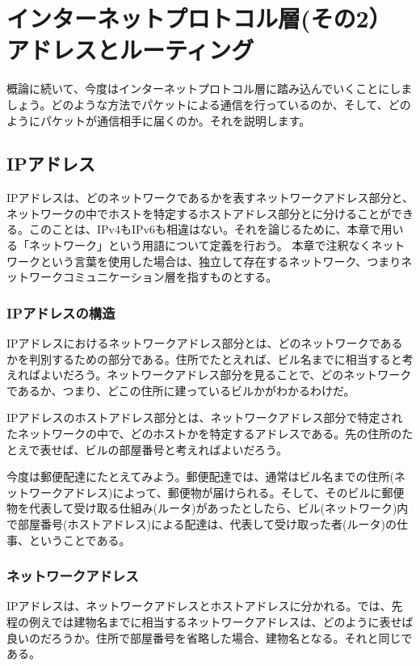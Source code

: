 \chapter{インターネットプロトコル層(その2） アドレスとルーティング}

概論に続いて、今度はインターネットプロトコル層に踏み込んでいくことにしましょう。どのような方法でパケットによる通信を行っているのか、そして、どのようにパケットが通信相手に届くのか。それを説明します。


\section{IPアドレス}

IPアドレスは、どのネットワークであるかを表すネットワークアドレス部分と、ネットワークの中でホストを特定するホストアドレス部分とに分けることができる。このことは、IPv4もIPv6も相違はない。それを論じるために、本章で用いる「ネットワーク」という用語について定義を行おう。
本章で注釈なくネットワークという言葉を使用した場合は、独立して存在するネットワーク、つまりネットワークコミュニケーション層を指すものとする。

\subsection{IPアドレスの構造}

IPアドレスにおけるネットワークアドレス部分とは、どのネットワークであるかを判別するための部分である。住所でたとえれば、ビル名までに相当すると考えればよいだろう。ネットワークアドレス部分を見ることで、どのネットワークであるか、つまり、どこの住所に建っているビルかがわかるわけだ。

IPアドレスのホストアドレス部分とは、ネットワークアドレス部分で特定されたネットワークの中で、どのホストかを特定するアドレスである。先の住所のたとえで表せば、ビルの部屋番号と考えればよいだろう。

今度は郵便配達にたとえてみよう。郵便配達では、通常はビル名までの住所(ネットワークアドレス)によって、郵便物が届けられる。そして、そのビルに郵便物を代表して受け取る仕組み(ルータ)があったとしたら、ビル(ネットワーク)内で部屋番号(ホストアドレス)による配達は、代表して受け取った者(ルータ)の仕事、ということである。

\subsection{ネットワークアドレス}

IPアドレスは、ネットワークアドレスとホストアドレスに分かれる。では、先程の例えでは建物名までに相当するネットワークアドレスは、どのように表せば良いのだろうか。住所で部屋番号を省略した場合、建物名となる。それと同じである。

